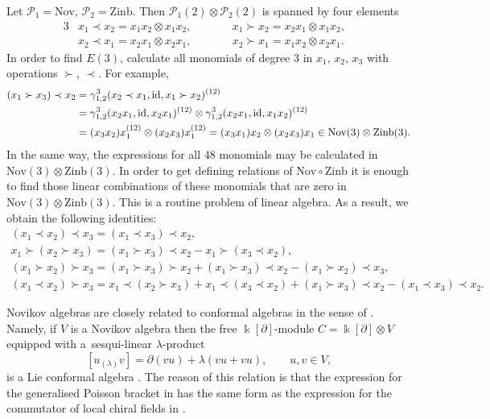 \documentclass[pdftex]{sigma}
\numberwithin{equation}{section}
\def\Nov{\mathrm{Nov}}
\def\Zinb{\mathrm{Zinb}}
\def\id {\mathop {\fam 0 id}\nolimits}
\begin{document}
\begin{Example}\label{exmp:Nov-Zinb}
Let $\mathcal P_1=\Nov$, $\mathcal P_2=\Zinb$.
Then $\mathcal P_1(2)\otimes \mathcal P_2(2)$ is spanned by four elements
\begin{alignat*}{3}
& x_1\prec x_2 = x_1x_2\otimes x_1x_2,
 \qquad &&
 x_1\succ x_2 = x_2x_1\otimes x_1x_2, &
 \\
& x_2\prec x_1 = x_2x_1\otimes x_2x_1,
 \qquad &&
 x_2\succ x_1 = x_1x_2\otimes x_2x_1. &
\end{alignat*}
In order to find $E(3)$, calculate all monomials of degree 3 in $x_1$, $x_2$, $x_3$
with operations $\succ$, $\prec$. For example,
%
\begin{align*}
 (x_1\succ x_3)\prec x_2 &= \gamma^3_{1,2} (x_2\prec x_1, \id, x_1\succ x_2)^{(12)}
 \\
 &=
 \gamma^3_{1,2}(x_2x_1, \id, x_2x_1)^{(12)}\otimes \gamma^3_{1,2}(x_2x_1, \id, x_1x_2)^{(12)}
 \\
& =
(x_3x_2)x_1^{(12)}\otimes (x_2x_3)x_1^{(12)}
=
(x_3x_1)x_2\otimes (x_2x_3)x_1 \in \Nov(3)\otimes \Zinb(3).
\end{align*}
%
In the same way, the expressions for all 48 monomials may be calculated
in $\Nov(3)\otimes \Zinb(3)$. In order to get defining relations
of $\Nov\circ \Zinb$ it is enough to find those linear combinations
of these monomials that are zero in $\Nov(3)\otimes \Zinb(3)$.
This is a routine problem of linear algebra.
As a result, we obtain the following identities:
%
\begin{gather}
(x_1\prec x_2)\prec x_3=(x_1\prec x_3)\prec x_2,\nonumber\\
x_1\succ (x_2\succ x_3) = (x_1\succ x_3)\prec x_2-x_1\succ (x_3\prec x_2),\nonumber\\
(x_1\succ x_2)\succ x_3=(x_1\succ x_3)\succ x_2 +(x_1\succ x_3)\prec x_2-(x_1\succ x_2)\prec x_3, \label{eq:pre-Novikov}\\
%
(x_1\prec x_2)\succ x_3=x_1\prec (x_2\succ x_3)+x_1\prec (x_3\prec x_2)
 +(x_1\succ x_3)\prec x_2-(x_1\prec x_3)\prec x_2.\nonumber
\end{gather}
\end{Example}

\begin{Remark}%
Novikov algebras are closely
related to conformal algebras in the sense
of \cite{Kac:VAforbeginners}.
Namely, if $V$ is a Novikov algebra then
the free $\Bbbk [\partial ]$-module $C=\Bbbk[\partial ]\otimes V$
equipped with a~sesqui-linear $\lambda $-product
\[
[u{}_{(\lambda )} v] = \partial (vu) + \lambda (vu + vu),
\qquad u,v\in V,
\]
is a Lie conformal algebra \cite{Xu1999}. The reason of this
relation is that the expression for the generalised Poisson
bracket in \cite{BN1985} has the same form as the expression
for the commutator of local chiral fields in \cite{Kac:VAforbeginners}.
\end{Remark}
\end{document}
